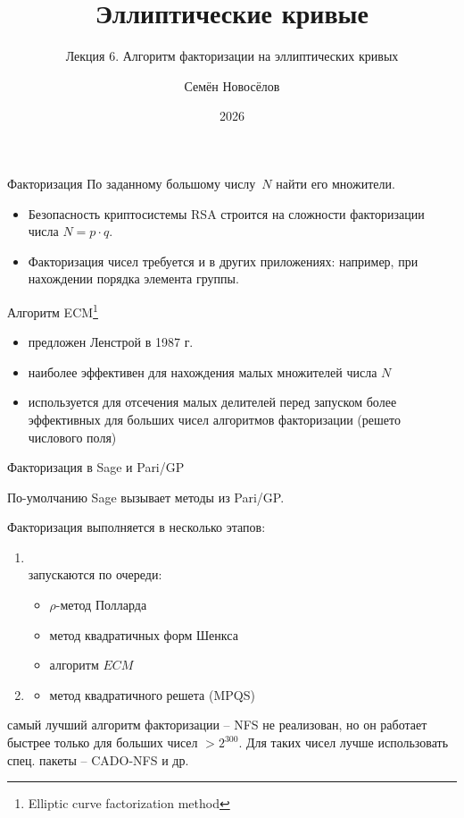\documentclass{beamer}
\title{Эллиптические кривые}
\subtitle{Лекция 6. Алгоритм факторизации на эллиптических кривых}
\author{Семён Новосёлов}
\institute{БФУ им. И. Канта}
\date{2026}
\begin{document}
\frame{\titlepage}

\begin{frame}{Факторизация}
	По заданному большому числу~$N$ найти его множители.

	\vspace{1em}

	\begin{itemize}
		\item Безопасность криптосистемы RSA строится на сложности факторизации числа $N = p \cdot q$.
		\vspace{0.5em}
		\item Факторизация чисел требуется и в других приложениях: например, при нахождении порядка элемента группы.
	\end{itemize}
\end{frame}

\begin{frame}{Алгоритм ECM\footnote{Elliptic curve factorization method}}
	\begin{itemize}
		\item предложен Ленстрой в 1987 г.
		\item наиболее эффективен для нахождения малых множителей числа $N$
		\item используется для отсечения малых делителей перед запуском более эффективных для больших чисел алгоритмов факторизации (решето числового поля)
	\end{itemize}
\end{frame}

\begin{frame}{Факторизация в Sage и Pari/GP}
	
	По-умолчанию Sage вызывает методы из Pari/GP.
	\vspace{1em}

	Факторизация выполняется в несколько этапов:
	\vspace{0.5em}
	\begin{enumerate}
		\item {}\\запускаются по очереди:
		\begin{itemize}
			\item $\rho$-метод Полларда
			\item метод квадратичных форм Шенкса
			\item алгоритм $ECM$
		\end{itemize}
		\vspace{0.5em}
		\item  {}
		\begin{itemize}
			\item метод квадратичного решета (MPQS)
		\end{itemize} 
	\end{enumerate}
	
	\vspace{3em}
	\begin{small}
		 самый лучший алгоритм факторизации -- NFS не реализован, но он работает быстрее только для больших чисел $> 2^{300}$. Для таких чисел лучше использовать спец. пакеты -- CADO-NFS и др.
	\end{small}
\end{frame}
\end{document}
